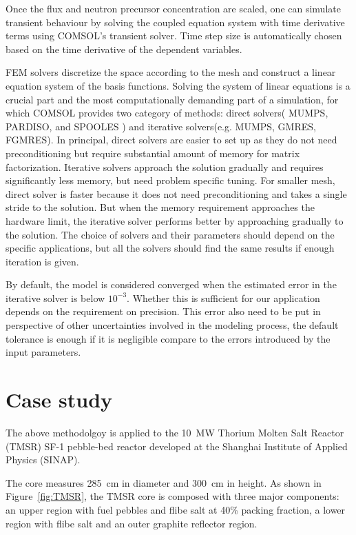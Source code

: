 \documentclass{elsarticle}
\begin{document}
Once the flux and neutron precursor concentration are scaled, one can simulate transient behaviour by solving the coupled equation system with time derivative terms using COMSOL's transient solver. Time step size is automatically chosen based on the time derivative of the dependent variables.


FEM solvers discretize the space according to the mesh and construct a linear equation system of the basis functions. 
Solving the system of linear equations is a crucial part and the most computationally demanding part of a simulation, for which COMSOL provides two category of methods: direct solvers( MUMPS, PARDISO, and SPOOLES ) and iterative solvers(e.g.  MUMPS, GMRES, FGMRES).
In principal, direct solvers are easier to set up as they do not need preconditioning but require substantial amount of memory for matrix factorization. Iterative solvers approach the solution gradually and requires significantly less memory, but need problem specific tuning.
For smaller mesh, direct solver is faster because it does not need preconditioning and takes a single stride to the solution. But when the memory requirement approaches the hardware limit, the iterative solver performs better by approaching gradually to the solution.
The choice of solvers and their parameters should depend on the specific applications, but all the solvers should find the same results if enough iteration is given. 

By default, the model is considered converged when the estimated error in the iterative solver is below $10^{-3}$. Whether this is sufficient for our application depends on the requirement on precision. This error also need to be put in perspective of other uncertainties involved in the modeling process, the default tolerance is enough if it is negligible compare to the errors introduced by the input parameters.







\section{Case study}
\label{sec:res}
The above methodolgoy is applied to the 10~MW Thorium Molten Salt Reactor (TMSR) SF-1 pebble-bed reactor\cite{wang2014a} developed at the Shanghai Institute of Applied Physics (SINAP). 

The core measures 285~cm in diameter and 300~cm in height. As shown in Figure~\ref{fig:TMSR}, the TMSR core is composed with three major components: an upper region with fuel pebbles and flibe salt at 40\% packing fraction, a lower region with flibe salt and an outer graphite reflector region. 
\end{document}
